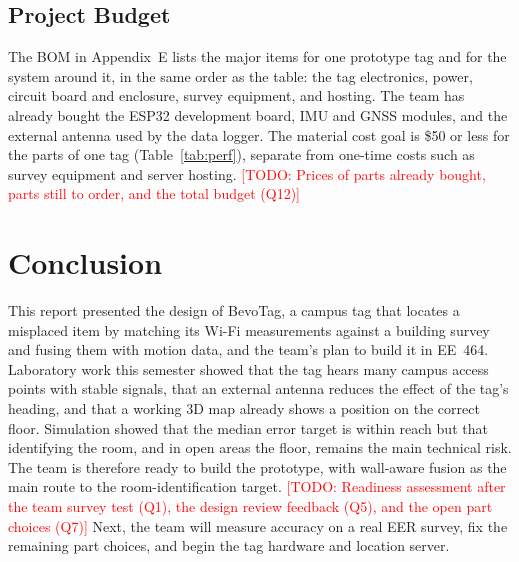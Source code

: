 \documentclass[12pt,letterpaper]{article}
\newcommand{\TODO}[1]{\textcolor{red}{[TODO: #1]}}
\begin{document}
\subsection{Project Budget}
The BOM in Appendix~E lists the major items for one prototype tag and for the system around it, in
the same order as the table: the tag electronics, power, circuit board and enclosure, survey
equipment, and hosting. The team has already bought the ESP32 development board, IMU and GNSS
modules, and the external antenna used by the data logger. The material cost goal is \$50 or less for
the parts of one tag (Table~\ref{tab:perf}), separate from one-time costs such as survey equipment
and server hosting. \TODO{Prices of parts already bought, parts still to order, and the total budget
(Q12)}

\section{Conclusion}\label{sec:conclusion}
This report presented the design of BevoTag, a campus tag that locates a misplaced item by matching
its Wi-Fi measurements against a building survey and fusing them with motion data, and the team's
plan to build it in EE~464. Laboratory work this semester showed that the tag hears many campus
access points with stable signals, that an external antenna reduces the effect of the tag's heading,
and that a working 3D map already shows a position on the correct floor. Simulation showed that the
median error target is within reach but that identifying the room, and in open areas the floor,
remains the main technical risk. The team is therefore ready to build the prototype, with wall-aware
fusion as the main route to the room-identification target. \TODO{Readiness assessment after the
team survey test (Q1), the design review feedback (Q5), and the open part choices (Q7)} Next, the team
will measure accuracy on a real EER survey, fix the remaining part choices, and begin the tag
hardware and location server.

\clearpage
\end{document}
